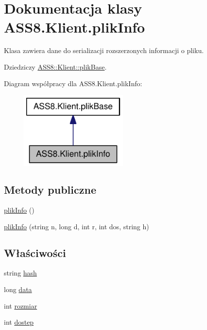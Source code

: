 \hypertarget{a00018}{
\section{Dokumentacja klasy ASS8.Klient.plikInfo}
\label{d1/d2b/a00018}
}
Klasa zawiera dane do serializacji rozszerzonych informacji o pliku.  


Dziedziczy \hyperlink{a00016}{ASS8::Klient::plikBase}.

Diagram współpracy dla ASS8.Klient.plikInfo:\nopagebreak
\begin{figure}[H]
\begin{center}
\leavevmode
\includegraphics[width=154pt]{de/df3/a00185}
\end{center}
\end{figure}
\subsection*{Metody publiczne}
\begin{CompactItemize}
\item 
\hyperlink{a00018_8c70fa9504ce6f44643d48aa6679ff12}{plikInfo} ()
\item 
\hyperlink{a00018_c7e3bef27e120693a190cf23af55426b}{plikInfo} (string n, long d, int r, int dos, string h)
\end{CompactItemize}
\subsection*{Właściwości}
\begin{CompactItemize}
\item 
string \hyperlink{a00018_3e622ab36164671a70caeeee3adb910d}{hash}
\item 
long \hyperlink{a00018_169c26c2a6ea0c035eed3aa84d8c26ba}{data}
\item 
int \hyperlink{a00018_e87d445327b832a69930c10f5555bf53}{rozmiar}
\item 
int \hyperlink{a00018_dd38176b1c4fdc58d99da35f4a797e37}{dostep}
\end{CompactItemize}
